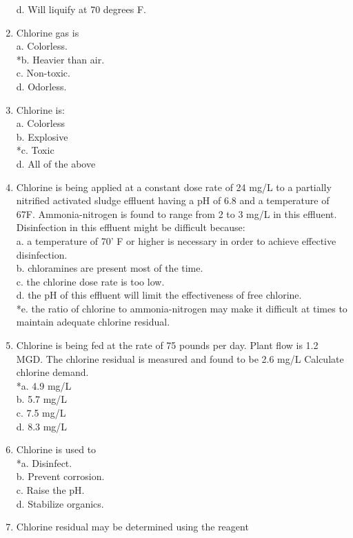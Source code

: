 \begin{enumerate}
d. Will liquify at 70 degrees F. \\
\item Chlorine gas is \\
a. Colorless. \\
*b. Heavier than air. \\
c. Non-toxic. \\
d. Odorless. \\
\item Chlorine is: \\
a. Colorless \\
b. Explosive \\
*c. Toxic \\
d. All of the above \\
\item Chlorine is being applied at a constant dose rate of 24 mg/L to a partially nitrified activated sludge effluent having a pH of 6.8 and a temperature of 67F.  Ammonia-nitrogen is found to range from 2 to 3 mg/L in this effluent. Disinfection in this effluent might be difficult because: \\
a. a temperature of 70' F or higher is necessary in order to achieve effective disinfection. \\
b. chloramines are present most of the time. \\
c. the chlorine dose rate is too low. \\
d. the pH of this effluent will limit the effectiveness of free chlorine. \\
*e. the ratio of chlorine to ammonia-nitrogen may make it difficult at times to maintain adequate chlorine residual. \\
\item Chlorine is being fed at the rate of 75 pounds per day. Plant flow is 1.2 MGD. The chlorine residual is measured and found to be 2.6 mg/L Calculate chlorine demand. \\
*a. 4.9 mg/L \\
b. 5.7 mg/L \\
c. 7.5 mg/L \\
d. 8.3 mg/L \\
\item Chlorine is used to \\
*a. Disinfect. \\
b. Prevent corrosion. \\
c. Raise the pH. \\
d. Stabilize organics. \\
\item Chlorine residual may be determined using the reagent \\

\end{enumerate}
